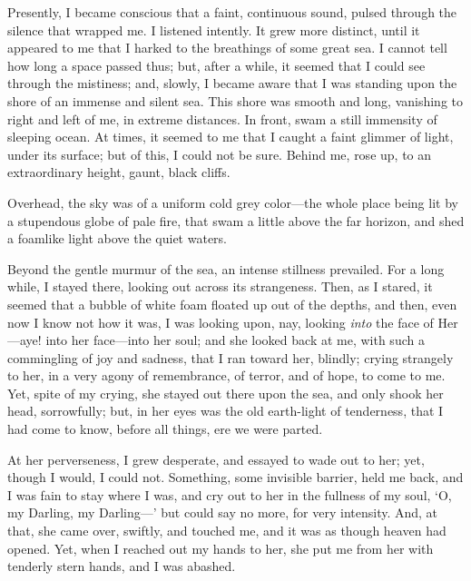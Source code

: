 Presently, I became conscious that a faint, continuous sound, pulsed through the silence that wrapped me. I listened intently. It grew more distinct, until it appeared to me that I harked to the breathings of some great sea. I cannot tell how long a space passed thus; but, after a while, it seemed that I could see through the mistiness; and, slowly, I became aware that I was standing upon the shore of an immense and silent sea. This shore was smooth and long, vanishing to right and left of me, in extreme distances. In front, swam a still immensity of sleeping ocean. At times, it seemed to me that I caught a faint glimmer of light, under its surface; but of this, I could not be sure. Behind me, rose up, to an extraordinary height, gaunt, black cliffs.

Overhead, the sky was of a uniform cold grey color---the whole place being lit by a stupendous globe of pale fire, that swam a little above the far horizon, and shed a foamlike light above the quiet waters.

Beyond the gentle murmur of the sea, an intense stillness prevailed. For a long while, I stayed there, looking out across its strangeness. Then, as I stared, it seemed that a bubble of white foam floated up out of the depths, and then, even now I know not how it was, I was looking upon, nay, looking \textit{into} the face of Her---aye! into her face---into her soul; and she looked back at me, with such a commingling of joy and sadness, that I ran toward her, blindly; crying strangely to her, in a very agony of remembrance, of terror, and of hope, to come to me. Yet, spite of my crying, she stayed out there upon the sea, and only shook her head, sorrowfully; but, in her eyes was the old earth-light of tenderness, that I had come to know, before all things, ere we were parted.

At her perverseness, I grew desperate, and essayed to wade out to her; yet, though I would, I could not. Something, some invisible barrier, held me back, and I was fain to stay where I was, and cry out to her in the fullness of my soul, ‘O, my Darling, my Darling---’ but could say no more, for very intensity. And, at that, she came over, swiftly, and touched me, and it was as though heaven had opened. Yet, when I reached out my hands to her, she put me from her with tenderly stern hands, and I was abashed.

\clearpage


